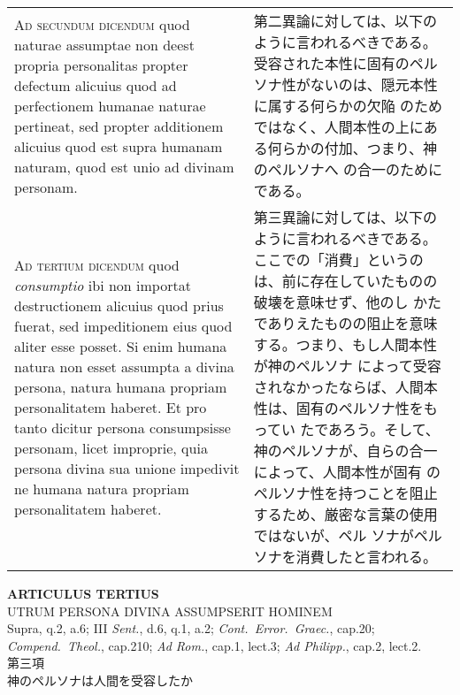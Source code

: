 \documentclass[10pt]{jsarticle} %
\begin{document}
\begin{longtable}{p{21em}p{21em}}
\\




{\scshape Ad secundum dicendum} quod naturae assumptae non deest propria
personalitas propter defectum alicuius quod ad perfectionem humanae
naturae pertineat, sed propter additionem alicuius quod est supra
humanam naturam, quod est unio ad divinam personam.


&

第二異論に対しては、以下のように言われるべきである。
受容された本性に固有のペルソナ性がないのは、隠元本性に属する何らかの欠陥
 のためではなく、人間本性の上にある何らかの付加、つまり、神のペルソナへ
 の合一のためにである。


\\




{\scshape Ad tertium dicendum} quod {\itshape consumptio} ibi non importat destructionem
alicuius quod prius fuerat, sed impeditionem eius quod aliter esse
posset. Si enim humana natura non esset assumpta a divina persona,
natura humana propriam personalitatem haberet. Et pro tanto dicitur
persona consumpsisse personam, licet improprie, quia persona divina sua
unione impedivit ne humana natura propriam personalitatem haberet.


&

第三異論に対しては、以下のように言われるべきである。
ここでの「消費」というのは、前に存在していたものの破壊を意味せず、他のし
 かたでありえたものの阻止を意味する。つまり、もし人間本性が神のペルソナ
 によって受容されなかったならば、人間本性は、固有のペルソナ性をもってい
 たであろう。そして、神のペルソナが、自らの合一によって、人間本性が固有
 のペルソナ性を持つことを阻止するため、厳密な言葉の使用ではないが、ペル
 ソナがペルソナを消費したと言われる。



\end{longtable}
\newpage








\begin{center}
 {\Large {\bf ARTICULUS TERTIUS}}\\
 {\large UTRUM PERSONA DIVINA ASSUMPSERIT HOMINEM}\\
 {\footnotesize Supra, q.2, a.6; III {\itshape Sent.}, d.6, q.1, a.2;
 {\itshape Cont.~Error.~Graec.}, cap.20; {\itshape Compend.~Theol.},
 cap.210; {\itshape Ad Rom.}, cap.1, lect.3; {\itshape Ad Philipp.},
 cap.2, lect.2.}\\
 {\Large 第三項\\神のペルソナは人間を受容したか}
\end{center}
\end{document}
